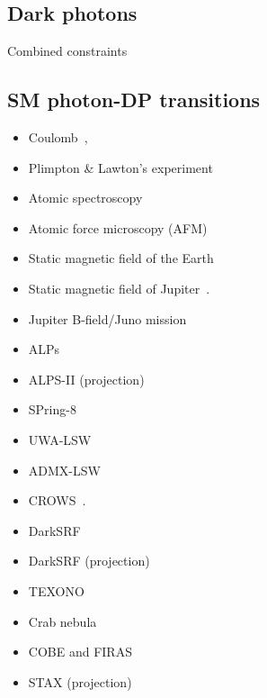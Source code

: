 \documentclass[8pt,twocolumn]{extarticle}
\begin{document}
\newpage

\begin{mdframed}
\section{Dark photons}\vspace{-0.5em}
Combined constraints~\cite{Caputo:2021eaa}
\subsection*{SM photon-DP transitions}\vspace{-0.5em}
\begin{itemize}\setlength\itemsep{-0.5em}
\item Coulomb~\cite{Goldhaber:2008xy,Williams:1971ms,Bartlett:1988yy,Tu:2005ge,Kroff:2020zhp},
\item Plimpton \& Lawton's experiment~\cite{Plimpton:1936ont,Kroff:2020zhp}
\item Atomic spectroscopy~\cite{Jaeckel:2010xx}
\item Atomic force microscopy (AFM)~\cite{Kroff:2020zhp}
\item Static magnetic field of the Earth~\cite{Goldhaber:1971mr,Fischbach:1994ir,Marocco:2021dku}
\item Static magnetic field of Jupiter~\cite{Davis:1975mn,Marocco:2021dku}. 
\item Jupiter B-field/Juno mission~\cite{Yan:2023kdg}
\item ALPs~\cite{Ehret:2010mh}
\item ALPS-II (projection)~\cite{Bahre:2013ywa}
\item SPring-8~\cite{Inada:2013tx}
\item UWA-LSW~\cite{Povey:2010hs,Parker:2013fxa}
\item ADMX-LSW~\cite{Wagner:2010mi}
\item CROWS~\cite{Betz:2013dza}.
\item DarkSRF~\cite{Romanenko:2023irv}
\item DarkSRF (projection)~\cite{Berlin:2022hfx}
\item TEXONO~\cite{Danilov:2018bks}
\item Crab nebula~\cite{Zechlin:2008tj}
\item COBE and FIRAS~\cite{Caputo:2020bdy}
\item STAX (projection)~\cite{Miyazaki:2022kxl}
\end{itemize}



\end{mdframed}
\end{document}
